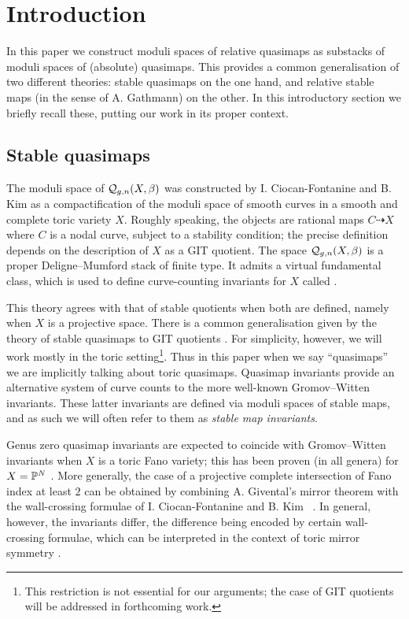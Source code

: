 \section{Introduction}
In this paper we construct moduli spaces of relative quasimaps as substacks of moduli spaces of (absolute) quasimaps. This provides a common generalisation of two different theories: stable quasimaps on the one hand, and relative stable maps (in the sense of A. Gathmann) on the other. In this introductory section we briefly recall these, putting our work in its proper context.

\subsection{Stable quasimaps}
The moduli space of  $\mathcal{Q}_{g,n}(X,\beta)$ was constructed by I. Ciocan-Fontanine and B. Kim \cite{CF-K} as a compactification of the moduli space of smooth curves in a smooth and complete toric variety $X$. Roughly speaking, the objects are rational maps $C \dashrightarrow X$ where $C$ is a nodal curve, subject to a stability condition; the precise definition depends on the description of $X$ as a GIT quotient.  The space $\mathcal{Q}_{g,n}(X,\beta)$ is a proper Deligne--Mumford stack of finite type.  It admits a virtual fundamental class, which is used to define curve-counting invariants for $X$ called .

This theory agrees with that of stable quotients \cite{MOP} when both are defined, namely when $X$ is a projective space.  There is a common generalisation given by the theory of stable quasimaps to GIT quotients \cite{CFKM}. For simplicity, however, we will work mostly in the toric setting\footnote{This restriction is not essential for our arguments; the case of GIT quotients will be addressed in forthcoming work.}. Thus in this paper when we say ``quasimaps'' we are implicitly talking about toric quasimaps.
Quasimap invariants provide an alternative system of curve counts to the more well-known Gromov--Witten invariants. These latter invariants are defined via moduli spaces of stable maps, and as such we will often refer to them as \emph{stable map invariants}.

Genus zero quasimap invariants are expected to coincide with Gromov--Witten invariants when $X$ is a toric Fano variety; this has been proven (in all genera) for $X=\mathbb P^N$ \cite[Theorem 3]{MOP} \cite[\S 5.4]{Manolache-Push}. More generally, the case of a projective complete intersection of Fano index at least $2$ can be obtained by combining A. Givental's mirror theorem \cite[Theorem 0.1]{Givental-mirror} with the wall-crossing formulae of I. Ciocan-Fontanine and B. Kim \cite[Conjecture 7.2.10]{CF-K}\  \cite[\S 5.5 and Conjecture 6.3.1]{CF-K-wallcrossing}.
In general, however, the invariants differ, the difference being encoded by certain wall-crossing formulae, which can be interpreted in the context of toric mirror symmetry \cite{CF-K-wallcrossing}.

